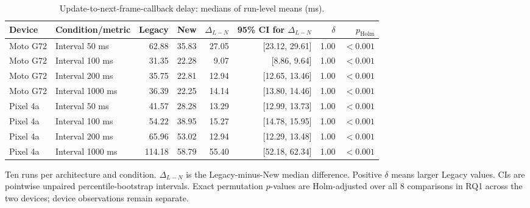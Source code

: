 \begin{table}[!t]
\centering
\caption{Update-to-next-frame-callback delay: medians of run-level means (ms).}
\label{tab:s1}
\small\setlength{\tabcolsep}{5pt}
\begin{tabular}{llrrrrrr}
\toprule
Device & Condition/metric & Legacy & New & $\Delta_{L-N}$ & 95\% CI for $\Delta_{L-N}$ & $\delta$ & $p_{\mathrm{Holm}}$ \\
\midrule
Moto G72 & Interval 50 ms & 62.88 & 35.83 & 27.05 & [23.12, 29.61] & 1.00 & $<0.001$ \\
Moto G72 & Interval 100 ms & 31.35 & 22.28 & 9.07 & [8.86, 9.64] & 1.00 & $<0.001$ \\
Moto G72 & Interval 200 ms & 35.75 & 22.81 & 12.94 & [12.65, 13.46] & 1.00 & $<0.001$ \\
Moto G72 & Interval 1000 ms & 36.39 & 22.25 & 14.14 & [13.80, 14.46] & 1.00 & $<0.001$ \\
Pixel 4a & Interval 50 ms & 41.57 & 28.28 & 13.29 & [12.99, 13.73] & 1.00 & $<0.001$ \\
Pixel 4a & Interval 100 ms & 54.22 & 38.95 & 15.27 & [14.78, 15.95] & 1.00 & $<0.001$ \\
Pixel 4a & Interval 200 ms & 65.96 & 53.02 & 12.94 & [12.29, 13.48] & 1.00 & $<0.001$ \\
Pixel 4a & Interval 1000 ms & 114.18 & 58.79 & 55.40 & [52.18, 62.34] & 1.00 & $<0.001$ \\
\bottomrule
\end{tabular}
\par\smallskip
\begin{minipage}{0.98\textwidth}\footnotesize
Ten runs per architecture and condition. $\Delta_{L-N}$ is the Legacy-minus-New median difference. Positive $\delta$ means larger Legacy values. CIs are pointwise unpaired percentile-bootstrap intervals. Exact permutation $p$-values are Holm-adjusted over all 8 comparisons in RQ1 across the two devices; device observations remain separate.
\end{minipage}
\end{table}
